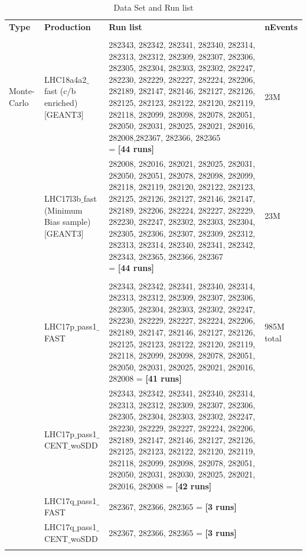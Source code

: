 \begin{table}[h]
\begin{tabular}{ p{1.0cm} | p{4.9cm} |  p{6.6cm} |  p{1.2cm}}
{\normalsize \textbf {Type}} &       {\normalsize \textbf {Production}} &       {\normalsize \textbf {Run list}} & {\normalsize \textbf {nEvents}} \\
\\ \hline
Monte-Carlo & LHC18a4a2$\_$fast (c/b enriched) [GEANT3] &282343, 282342, 282341, 282340, 282314, 282313, 282312, 282309, 282307, 282306, 282305, 282304, 282303, 282302, 282247, 282230, 282229, 282227, 282224, 282206, 282189, 282147, 282146, 282127, 282126, 282125, 282123, 282122, 282120, 282119, 282118, 282099, 282098, 282078, 282051, 282050, 282031, 282025, 282021, 282016, 282008,282367, 282366, 282365 $~~~~~~~~~~~~~~~~$ = \textbf{[44 runs]} & 23M\\

& LHC17l3b$\_$fast (Minimum Bias sample) [GEANT3] &282008, 282016, 282021, 282025, 282031, 282050, 282051, 282078, 282098, 282099, 282118, 282119, 282120, 282122, 282123, 282125, 282126, 282127, 282146, 282147, 282189, 282206, 282224, 282227, 282229, 282230, 282247, 282302, 282303, 282304, 282305, 282306, 282307, 282309, 282312, 282313, 282314, 282340, 282341, 282342, 282343, 282365, 282366, 282367 $~~~~~~~~~~~~~~~~$ = \textbf{[44 runs]} & 23M\\
\\ \hline

\multirow{7}{*}{} Data& LHC17p$\_$pass1$\_$FAST & 282343, 282342, 282341, 282340, 282314, 282313, 282312, 282309, 282307, 282306, 282305, 282304, 282303, 282302, 282247, 282230, 282229, 282227, 282224, 282206, 282189, 282147, 282146, 282127, 282126, 282125, 282123, 282122, 282120, 282119, 282118, 282099, 282098, 282078, 282051, 282050, 282031, 282025, 282021, 282016, 282008  = \textbf{[41 runs]}& 985M total\\
                  & LHC17p$\_$pass1$\_$CENT$\_$woSDD &282343, 282342, 282341, 282340, 282314, 282313, 282312, 282309, 282307, 282306, 282305, 282304, 282303, 282302, 282247, 282230, 282229, 282227, 282224, 282206, 282189, 282147, 282146, 282127, 282126, 282125, 282123, 282122, 282120, 282119, 282118, 282099, 282098, 282078, 282051, 282050, 282031, 282030, 282025, 282021, 282016, 282008  = \textbf{[42 runs]} &  \\
 & LHC17q$\_$pass1$\_$FAST & 282367, 282366, 282365  = \textbf{[3 runs]} &  \\
  & LHC17q$\_$pass1$\_$CENT$\_$woSDD& 282367, 282366, 282365  = \textbf{[3 runs]} & \\
 \hline \hline
\label{tab:Sample}
\end{tabular}
\\
\caption {Data Set and Run list}
\end{table}

